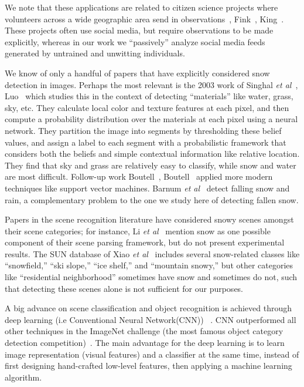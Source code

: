We note that these applications are related to citizen science
projects where volunteers across a wide geographic area send 
in observations~\cite{greatsunflower}, Fink\etal~\cite{ebirds}, King\etal~\cite{king09snowtweets}. These projects
often use social media, but require observations to be made
explicitly, whereas in our work we ``passively'' analyze social
media feeds generated by untrained and unwitting individuals.

 We know of only a handful of
papers that have explicitly considered snow detection in
images. Perhaps the most relevant is the 2003 work of Singhal
\textit{et al}~\cite{singhal2003spatialcontext}, Luo\etal~\cite{luo2003spatialcontext}
which studies this in the context of detecting ``materials'' like
water, grass, sky, etc. They calculate local color and texture
features at each pixel, and then compute a probability
distribution over the materials at each pixel using a neural
network. They partition the image into segments by thresholding these
belief values, and assign a label to each segment with a probabilistic
framework that considers both the beliefs and simple
contextual information like relative location.
They find that sky and grass are relatively easy to classify, while snow and water are
most difficult.  Follow-up work Boutell\etal~\cite{boutell2006semanticfeature}, Boutell~\cite{boutell2005exploiting} applied more modern techniques like
support vector machines.  Barnum \textit{et al}~\cite{rain2009IJCV} detect falling snow and rain, a complementary problem to the one we study here of detecting fallen
snow.

 Papers in the scene recognition literature have considered
snowy scenes amongst their scene categories; for instance, Li \textit{et
	al}~\cite{li2009totalscene,li2007event} mention snow as one possible
component of their scene parsing framework, but do not present
experimental results. The SUN database of Xiao \textit{et
	al}~\cite{XiaoHEOT10} includes several snow-related classes like
``snowfield,'' ``ski slope,'' ``ice shelf,'' and ``mountain snowy,''
but other categories like ``residential neighborhood'' sometimes have
snow and sometimes do not, such that detecting these scenes alone
is not sufficient for our purposes. 

A big advance  on scene classification and object recognition is achieved through deep learning (i.e Conventional Neural Network(CNN)) ~\cite{krizhevsky2012imagenet,chatfield2011devil,zhou2014learning,grangier2009deep}. CNN outperformed all other techniques in the ImageNet challenge (the most famous object category detection competition)~\cite{ilsvrcarxiv14}. The main advantage for the deep learning is to learn image representation (visual features) and a classifier at the same time, instead of first designing hand-crafted low-level features, then applying a machine learning algorithm. 







